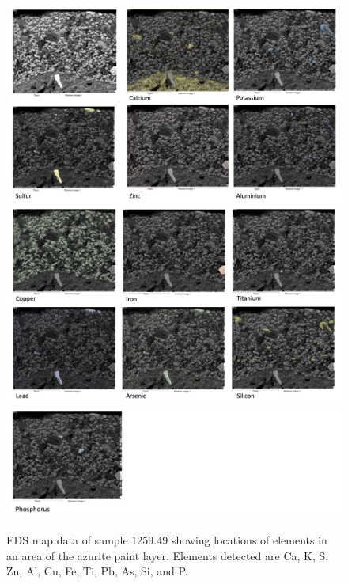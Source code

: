 \begin{figure}[H]
\centering
\begin{minipage}[t]{\linewidth}
  \centering
  \includegraphics[width=0.9\linewidth]{1259.49_mapdata_1}
\hfill
\includegraphics[width=0.9\linewidth]{1259.49_mapdata_2}
\hfill
\includegraphics[width=0.9\linewidth]{1259.49_mapdata_3}
\hfill
\end{minipage}
\caption[EDS map data, sample 1259.49.]{EDS map data of sample 1259.49 showing locations of elements in an area of the azurite paint layer. Elements detected are Ca, K, S, Zn, Al, Cu, Fe, Ti, Pb, As, Si, and P.}
\label{fig:1259.49_mapdata}
\end{figure}


